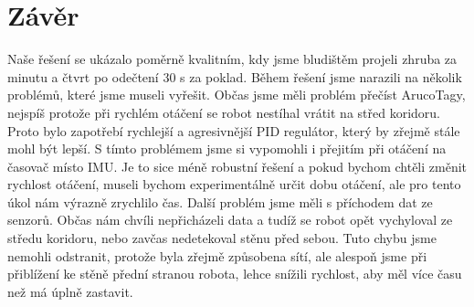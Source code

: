 \section{Závěr}

Naše řešení se ukázalo poměrně kvalitním, kdy jsme bludištěm projeli zhruba za minutu a čtvrt po odečtení 30 s za poklad. Během řešení jsme narazili na několik problémů, které jsme museli vyřešit. Občas jsme měli problém přečíst ArucoTagy, nejspíš protože při rychlém otáčení se robot nestíhal vrátit na střed koridoru. Proto bylo zapotřebí rychlejší a agresivnější PID regulátor, který by zřejmě stále mohl být lepší. S tímto problémem jsme si vypomohli i přejitím při otáčení na časovač místo IMU. Je to sice méně robustní řešení a pokud bychom chtěli změnit rychlost otáčení, museli bychom experimentálně určit dobu otáčení, ale pro tento úkol nám výrazně zrychlilo čas.
Další problém jsme měli s příchodem dat ze senzorů. Občas nám chvíli nepřicházeli data a tudíž se robot opět vychyloval ze středu koridoru, nebo zavčas nedetekoval stěnu před sebou. Tuto chybu jsme nemohli odstranit, protože byla zřejmě způsobena sítí, ale alespoň jsme při přiblížení ke stěně přední stranou robota, lehce snížili rychlost, aby měl více času než má úplně zastavit.


